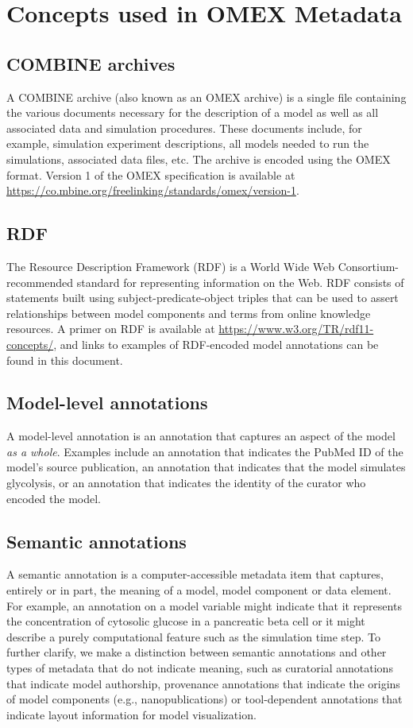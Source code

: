 \documentclass[pdftex,rgb,dvipsnames,svgnames,hyperref,table]{report}
\begin{document}
\label{sec:conventions}

\section{Concepts used in OMEX Metadata}
\subsection{COMBINE archives}
A COMBINE archive (also known as an OMEX archive) is a single file containing the various documents necessary for the description of a model as well as all associated data and simulation procedures. These documents include, for example, simulation experiment descriptions, all models needed to run the simulations, associated data files, etc. The archive is encoded using the OMEX format. Version 1 of the OMEX specification is available at \url{https://co.mbine.org/freelinking/standards/omex/version-1}.

\subsection{RDF}
The Resource Description Framework (RDF) is a World Wide Web Consortium-recommended standard for representing information on the Web. RDF consists of statements built using subject-predicate-object triples that can be used to assert relationships between model components and terms from online knowledge resources. A primer on RDF is available at \url{https://www.w3.org/TR/rdf11-concepts/}, and links to examples of RDF-encoded model annotations can be found in this document.

\subsection{Model-level annotations}
A model-level annotation is an annotation that captures an aspect of the model \textit{as a whole}. Examples include an annotation that indicates the PubMed ID of the model's source publication, an annotation that indicates that the model simulates glycolysis, or an annotation that indicates the identity of the curator who encoded the model. 

\subsection{Semantic annotations}
A semantic annotation is a computer-accessible metadata item that captures, entirely or in part, the meaning of a model, model component or data element. For example, an annotation on a model variable might indicate that it represents the concentration of cytosolic glucose in a pancreatic beta cell or it might describe a purely computational feature such as the simulation time step. To further clarify, we make a distinction between semantic annotations and other types of metadata that do not indicate meaning, such as curatorial annotations that indicate model authorship, provenance annotations that indicate the origins of model components (e.g., nanopublications) or tool-dependent annotations that indicate layout information for model visualization.
\end{document}
